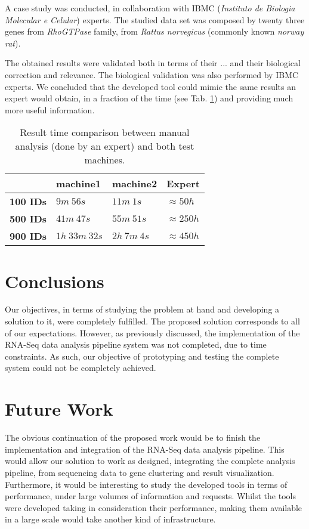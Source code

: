\documentclass[9pt,a4paper]{extarticle}
\begin{document}
\begin{multicols}{2}
A case study was conducted, in collaboration with IBMC (\emph{Instituto de
Biologia Molecular e Celular}) experts. The studied data set was composed by
twenty three genes from \emph{RhoGTPase} family, from \emph{Rattus norvegicus}
(commonly known \emph{norway rat}).

The obtained results were validated both in terms of their ... and their
biological correction and relevance. The biological validation was also
performed by IBMC experts. We concluded that the developed tool could mimic the
same results an expert would obtain, in a fraction of the time (see Tab.
\ref{tab:stress}) and providing much more useful information.

\begin{table}[H]
  \centering
  \caption{Result time comparison between manual analysis (done by an expert) and both test machines.}
  \begin{tabular}{l|lll}
    & \textbf{machine1} & \textbf{machine2} & \textbf{Expert} \\ \hline
    \textbf{100 IDs}   & $9m\ 56s$          & $11m\ 1s$      & $\approx 50h$\\
    \textbf{500 IDs}   & $41m\ 47s$         & $55m\ 51s$     & $\approx 250h$\\
    \textbf{900 IDs}   & $1h\ 33m\ 32s$     & $2h\ 7m\ 4s$   & $\approx 450h$\\
  \end{tabular}
  \label{tab:stress}
\end{table}

\section{Conclusions}

Our objectives, in terms of studying the problem at hand and developing a
solution to it, were completely fulfilled. The proposed solution corresponds to
all of our expectations. However, as previously discussed, the implementation of
the RNA-Seq data analysis pipeline system was not completed, due to time
constraints. As such, our objective of prototyping and testing the complete
system could not be completely achieved.

\section{Future Work}

The obvious continuation of the proposed work would be to finish the
implementation and integration of the RNA-Seq data analysis pipeline. This would
allow our solution to work as designed, integrating the complete analysis
pipeline, from sequencing data to gene clustering and result visualization.
Furthermore, it would be interesting to study the developed tools in terms of
performance, under large volumes of information and requests. Whilst the tools
were developed taking in consideration their performance, making them available
in a large scale would take another kind of infrastructure.



\end{multicols}
\end{document}
